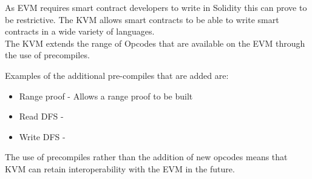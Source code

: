 As EVM requires smart contract developers to write in Solidity this can prove to be restrictive. The KVM allows smart contracts to be able to write smart contracts in a wide variety of languages. \\

The KVM extends the range of Opcodes that are available on the EVM through the use of precompiles. 

Examples of the additional pre-compiles that are added are: 

\begin{itemize} 
\item Range proof - Allows a range proof to be built 
\item Read DFS -
\item Write DFS -
\end{itemize} 

The use of precompiles rather than the addition of new opcodes means that KVM can retain interoperability with the EVM in the future. 